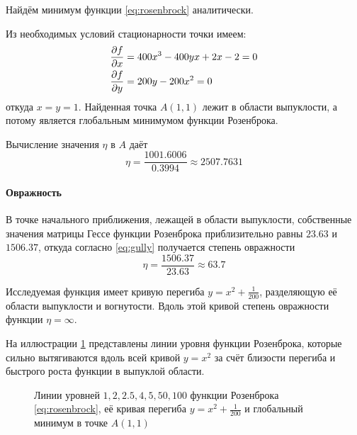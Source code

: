 Найдём минимум функции \eqref{eq:rosenbrock} аналитически.

Из необходимых условий стационарности точки имеем:
\begin{align*}
  \frac{\partial{f}}{\partial{x}} &= 400x^3-400yx+2x-2 = 0 \\
  \frac{\partial{f}}{\partial{y}} &= 200y-200x^2 = 0
\end{align*}
откуда $x = y = 1$. Найденная точка $A(1, 1)$ лежит в области
выпуклости, а потому является глобальным минимумом функции Розенброка.

Вычисление значения $\eta$ в $A$ даёт
\begin{equation}
  \label{eq:rosenbrock-gully-extr}
  \eta = \frac{1001.6006}{0.3994} \approx 2507.7631
\end{equation}

\paragraph{Овражность}

В точке начального приближения, лежащей в области выпуклости,
собственные значения матрицы Гессе функции Розенброка приблизительно
равны $23.63$ и $1506.37$, откуда согласно \eqref{eq:gully} получается
степень овражности
\begin{equation}
  \label{eq:rosenbrock-gully-start}
  \eta = \frac{1506.37}{23.63} \approx 63.7
\end{equation}

Исследуемая функция имеет кривую перегиба $y=x^2+\frac{1}{200}$,
разделяющую её области выпуклости и вогнутости. Вдоль этой кривой
степень овражности функции $\eta = \infty$.

На иллюстрации \ref{fig:rosenbrock-contours} представлены линии уровня
функции Розенброка, которые сильно вытягиваются вдоль всей кривой
$y=x^2$ за счёт близости перегиба и быстрого роста функции в выпуклой
области.

\begin{figure}[thb]
  \centering
  \caption[Функция Розенброка]{Линии уровней $1, 2, 2.5, 4, 5, 50,
    100$ функции Розенброка \eqref{eq:rosenbrock}, её кривая перегиба
    $y=x^2+\frac{1}{200}$ и глобальный минимум в точке $A(1, 1)$}
  \label{fig:rosenbrock-contours}
\end{figure}

